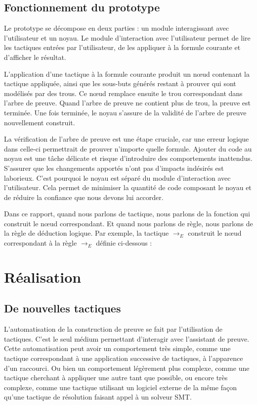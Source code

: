\documentclass[french,titlepage]{article}
\begin{document}
\subsection{Fonctionnement du prototype} \label{env_travail:fonctionnement_proto}
Le prototype se décompose en deux parties : un module interagissant avec l'utilisateur et un noyau. Le module d'interaction avec l'utilisateur permet de lire les tactiques entrées par l'utilisateur, de les appliquer à la formule courante et d'afficher le résultat.

L'application d'une tactique à la formule courante produit
un nœud contenant la tactique appliquée, ainsi que les sous-buts générés restant à prouver qui sont modélisés par des trous. Ce nœud remplace ensuite le trou correspondant dans l'arbre de preuve. Quand l'arbre de preuve ne contient plus de trou, la preuve est terminée. Une fois terminée, le noyau s'assure de la validité de l'arbre de preuve nouvellement construit.

La vérification de l'arbre de preuve est une étape cruciale, car une erreur logique dans celle-ci permettrait de prouver n'importe quelle formule. Ajouter du code au noyau est une tâche délicate et risque d'introduire des comportements inattendus. S'assurer que les changements apportés n'ont pas d'impacts indésirés est laborieux. C'est pourquoi le noyau est séparé du module d'interaction avec l'utilisateur. Cela permet de minimiser la quantité de code composant le noyau et de réduire la confiance que nous devons lui accorder.

Dans ce rapport, quand nous parlons de tactique, nous parlons de la fonction qui construit le nœud correspondant. Et quand nous parlons de règle, nous parlons de la règle de déduction logique. Par exemple, la tactique $\to_E$ construit le nœud correspondant à la règle $\to_E$ définie ci-dessous :
\begin{mathpar}
\end{mathpar}



\section{Réalisation} \label{realisation}
\subsection{De nouvelles tactiques} \label{realisation:nouvelles_tactiques}
L'automatisation de la construction de preuve se fait par l'utilisation de tactiques. C'est le seul médium permettant d'interagir avec l'assistant de preuve. Cette automatisation peut avoir un comportement très simple, comme une tactique correspondant à une application successive de tactiques, à l'apparence d'un raccourci. Ou bien un comportement légèrement plus complexe, comme une tactique cherchant à appliquer une autre tant que possible, ou encore très complexe, comme une tactique utilisant un logiciel externe de la même façon qu'une tactique de résolution faisant appel à un solveur SMT.
\end{document}
